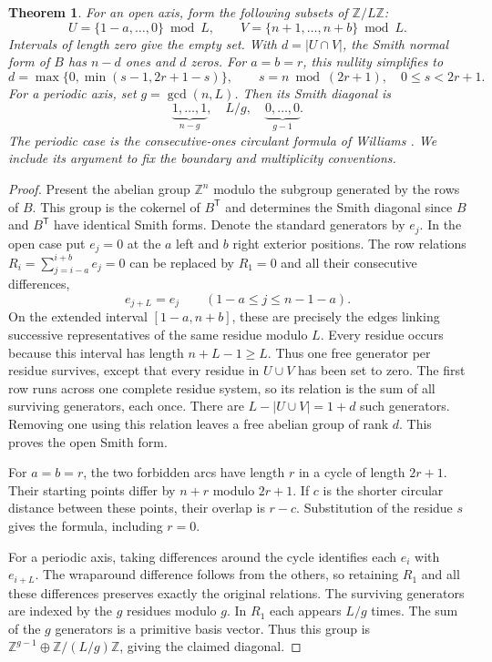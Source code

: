 \documentclass[11pt]{article}
\newtheorem{theorem}{Theorem}
\newcommand{\Z}{\mathbb Z}
\begin{document}
\begin{theorem}
For an open axis, form the following subsets of $\Z/L\Z$:
\[
 U=\{1-a,\ldots,0\}\bmod L,\qquad V=\{n+1,\ldots,n+b\}\bmod L .
\]
Intervals of length zero give the empty set. With $d=|U\cap V|$, the Smith normal form of $B$ has $n-d$ ones and $d$ zeros. For $a=b=r$, this nullity simplifies to
\[
 d=\max\{0,\min(s-1,2r+1-s)\}, \qquad s=n\bmod(2r+1),\quad 0\le s<2r+1.
\]
For a periodic axis, set $g=\gcd(n,L)$. Then its Smith diagonal is
\[
 \underbrace{1,\ldots,1}_{n-g},\quad L/g,\quad
 \underbrace{0,\ldots,0}_{g-1}.
\]
The periodic case is the consecutive-ones circulant formula of Williams \cite[Corollary 3.3(i)]{williams}. We include its argument to fix the boundary and multiplicity conventions.
\end{theorem}
\begin{proof}
Present the abelian group $\Z^n$ modulo the subgroup generated by the rows of $B$. This group is the cokernel of $B^{\mathsf T}$ and determines the Smith diagonal since $B$ and $B^{\mathsf T}$ have identical Smith forms. Denote the standard generators by $e_j$. In the open case put $e_j=0$ at the $a$ left and $b$ right exterior positions. The row relations $R_i=\sum_{j=i-a}^{i+b}e_j=0$ can be replaced by $R_1=0$ and all their consecutive differences,
\[
                e_{j+L}=e_j\qquad (1-a\le j\le n-1-a).
\]
On the extended interval $[1-a,n+b]$, these are precisely the edges linking successive representatives of the same residue modulo $L$. Every residue occurs because this interval has length $n+L-1\ge L$. Thus one free generator per residue survives, except that every residue in $U\cup V$ has been set to zero. The first row runs across one complete residue system, so its relation is the sum of all surviving generators, each once. There are $L-|U\cup V|=1+d$ such generators. Removing one using this relation leaves a free abelian group of rank $d$. This proves the open Smith form.

For $a=b=r$, the two forbidden arcs have length $r$ in a cycle of length $2r+1$. Their starting points differ by $n+r$ modulo $2r+1$. If $c$ is the shorter circular distance between these points, their overlap is $r-c$. Substitution of the residue $s$ gives the formula, including $r=0$.

For a periodic axis, taking differences around the cycle identifies each $e_i$ with $e_{i+L}$. The wraparound difference follows from the others, so retaining $R_1$ and all these differences preserves exactly the original relations. The surviving generators are indexed by the $g$ residues modulo $g$. In $R_1$ each appears $L/g$ times. The sum of the $g$ generators is a primitive basis vector. Thus this group is $\Z^{g-1}\oplus\Z/(L/g)\Z$, giving the claimed diagonal.
\end{proof}
\end{document}
